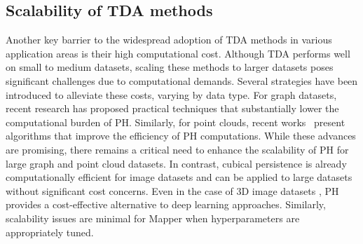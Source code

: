 \subsection{Scalability of TDA methods}

Another key barrier to the widespread adoption of TDA methods in various application areas is their high computational cost. Although TDA performs well on small to medium datasets, scaling these methods to larger datasets poses significant challenges due to computational demands. Several strategies have been introduced to alleviate these costs, varying by data type. For graph datasets, recent research \cite{akcora2022reduction, yan2022neural} has proposed practical techniques that substantially lower the computational burden of PH. Similarly, for point clouds, recent works~\cite{de2022ripsnet, zhou2022learning, malott2020topology} present algorithms that improve the efficiency of PH computations. While these advances are promising, there remains a critical need to enhance the scalability of PH for large graph and point cloud datasets. In contrast, cubical persistence is already computationally efficient for image datasets and can be applied to large datasets without significant cost concerns. Even in the case of 3D image datasets \cite{gonzalez2016fast}, PH provides a cost-effective alternative to deep learning approaches. Similarly, scalability issues are minimal for Mapper when hyperparameters are appropriately tuned.


 